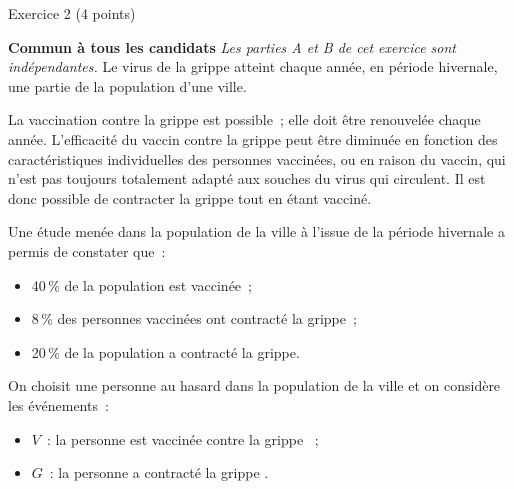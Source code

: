 
\begin{h2}Exercice 2 (4 points)\end{h2}
\textbf{Commun à tous les candidats }
\bigbreak
\emph{Les parties A et B de cet exercice sont indépendantes.}
\medbreak
Le virus de la grippe atteint chaque année, en période hivernale, une partie de la population d'une ville.
\par
La vaccination contre la grippe est possible~; elle doit être renouvelée chaque année.
\bigbreak
{}
\medbreak
L'efficacité du vaccin contre la grippe peut être diminuée en fonction des caractéristiques
individuelles des personnes vaccinées, ou en raison du vaccin, qui n'est pas toujours
totalement adapté aux souches du virus qui circulent. Il est donc possible de contracter la
grippe tout en étant vacciné.
\par
Une étude menée dans la population de la ville à l'issue de la période hivernale a permis de constater que~:
\begin{itemize}
     \item40\,\% de la population est vaccinée~;
     \item8\,\% des personnes vaccinées ont contracté la grippe~;
     \item20\,\% de la population a contracté la grippe.
\end{itemize}
\smallbreak
On choisit une personne au hasard dans la population de la ville et on considère les événements~:
\begin{itemize}[label=---]
     \item $V$~: \og la personne est vaccinée contre la grippe \fg{}~;
     \item $G$~: \og la personne a contracté la grippe \fg.
\end{itemize}
\medbreak
